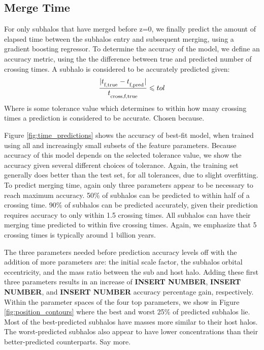 \documentclass[fleqn,usenatbib]{mnras}
\newcommand\edits[1]{{\color{red}#1}}
\begin{document}
{\subsection{Merge Time}
\label{sec:merge time}
For only subhalos that have merged before z=0, we finally predict the amount of elapsed time between the subhalos entry and subsequent merging, using a gradient boosting regressor. To determine the accuracy of the model, we define an accuracy metric, using the the difference between true and predicted number of crossing times. A subhalo is considered to be accurately predicted given:
\begin{equation}
    \label{eq:time}
    \frac{|t_\textsubscript{f,true} - t_\textsubscript{f,pred}|}{t_\textsubscript{cross,f,true}} \leq tol
\end{equation}
Where  is some tolerance value which determines to within how many crossing times a prediction is considered to be accurate. \edits{Chosen because.}

Figure \ref{fig:time_predictions} shows the accuracy of best-fit model, when trained using all and increasingly small subsets of the feature parameters. Because accuracy of this model depends on the selected tolerance value, we show the accuracy given several different choices of tolerance. Again, the training set generally does better than the test set, for all tolerances, due to slight  overfitting. To predict merging time, again only three parameters appear to be necessary to reach maximum accuracy. 50\% of subhalos can be predicted to within half of a crossing time. 90\% of subhalos can be predicted accurately, given their prediction requires accuracy to only within 1.5 crossing times. All subhalos can have their merging time predicted to within five crossing times. Again, we emphasize that 5 crossing times is typically around 1 billion years.

The three parameters needed before prediction accuracy levels off with the addition of more parameters are: the initial scale factor, the subhalos orbital eccentricity, and the mass ratio between the sub and host halo. Adding these first three parameters results in an increase of \textbf{INSERT NUMBER}, \textbf{INSERT NUMBER}, and  \textbf{INSERT NUMBER} accuracy percentage gain, respectively. Within the parameter spaces of the four top parameters, we show in Figure \ref{fig:position_contours} where the best and worst 25\% of predicted subhalos lie. Most of the best-predicted subhalos have masses more similar to their host halos. The worst-predicted subhalos also appear to have lower concentrations than their better-predicted counterparts. \edits{Say more.}

}
\end{document}
